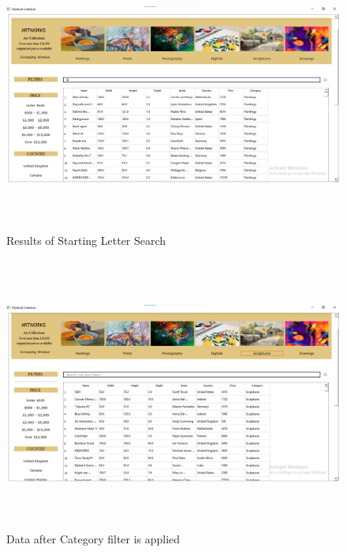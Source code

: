 \documentclass[12pt]{article}
\begin{document}
    \newpage
    \begin{figure}[ht!]
	    \includegraphics[width = 16cm, height = 9cm]{Starting Letter Search.png}
	    \renewcommand{\thefigure}{3.9}
	    \caption{Results of Starting Letter Search}
    \end{figure}
    \begin{figure}[ht!]
	    \includegraphics[width = 16cm, height = 9cm]{Category Filters.png}
	    \renewcommand{\thefigure}{3.10}
	    \caption{Data after Category filter is applied}
    \end{figure}
    
\end{document}
